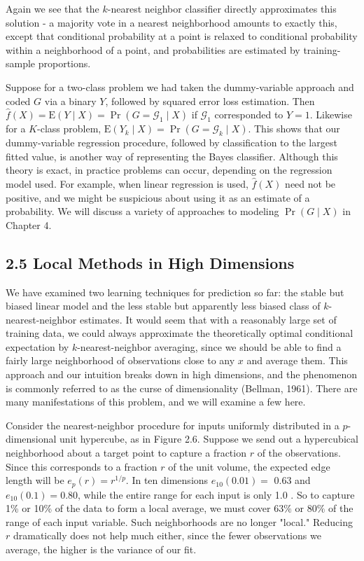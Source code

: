 \documentclass[10pt]{article}
\begin{document}
Again we see that the $k$-nearest neighbor classifier directly approximates this solution - a majority vote in a nearest neighborhood amounts to exactly this, except that conditional probability at a point is relaxed to conditional probability within a neighborhood of a point, and probabilities are estimated by training-sample proportions.

Suppose for a two-class problem we had taken the dummy-variable approach and coded $G$ via a binary $Y$, followed by squared error loss estimation. Then $\hat{f}(X)=\mathrm{E}(Y \mid X)=\operatorname{Pr}\left(G=\mathcal{G}_{1} \mid X\right)$ if $\mathcal{G}_{1}$ corresponded to $Y=1$. Likewise for a $K$-class problem, $\mathrm{E}\left(Y_{k} \mid X\right)=\operatorname{Pr}\left(G=\mathcal{G}_{k} \mid X\right)$. This shows that our dummy-variable regression procedure, followed by classification to the largest fitted value, is another way of representing the Bayes classifier. Although this theory is exact, in practice problems can occur, depending on the regression model used. For example, when linear regression is used, $\hat{f}(X)$ need not be positive, and we might be suspicious about using it as an estimate of a probability. We will discuss a variety of approaches to modeling $\operatorname{Pr}(G \mid X)$ in Chapter 4.

\subsection*{2.5 Local Methods in High Dimensions}
We have examined two learning techniques for prediction so far: the stable but biased linear model and the less stable but apparently less biased class of $k$-nearest-neighbor estimates. It would seem that with a reasonably large set of training data, we could always approximate the theoretically optimal conditional expectation by $k$-nearest-neighbor averaging, since we should be able to find a fairly large neighborhood of observations close to any $x$ and average them. This approach and our intuition breaks down in high dimensions, and the phenomenon is commonly referred to as the curse of dimensionality (Bellman, 1961). There are many manifestations of this problem, and we will examine a few here.

Consider the nearest-neighbor procedure for inputs uniformly distributed in a $p$-dimensional unit hypercube, as in Figure 2.6. Suppose we send out a hypercubical neighborhood about a target point to capture a fraction $r$ of the observations. Since this corresponds to a fraction $r$ of the unit volume, the expected edge length will be $e_{p}(r)=r^{1 / p}$. In ten dimensions $e_{10}(0.01)=$ 0.63 and $e_{10}(0.1)=0.80$, while the entire range for each input is only 1.0 . So to capture 1\% or 10\% of the data to form a local average, we must cover $63 \%$ or $80 \%$ of the range of each input variable. Such neighborhoods are no longer "local." Reducing $r$ dramatically does not help much either, since the fewer observations we average, the higher is the variance of our fit.
\end{document}
